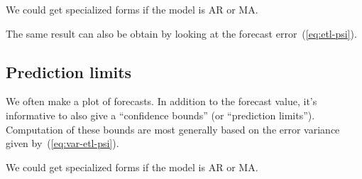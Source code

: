 \documentclass[12pt]{article}
\begin{document}
We could get specialized forms if the model is AR or MA.

The same result can also be obtain
by looking at the forecast error~(\ref{eq:etl-psi}).

\subsection{Prediction limits}

We often make a plot of forecasts.
In addition to the forecast value,
it's informative to also give a ``confidence bounds'' (or ``prediction
limits'').
Computation of these bounds are most generally based on
the error variance given by~(\ref{eq:var-etl-psi}).

We could get specialized forms if the model is AR or MA.
\end{document}
